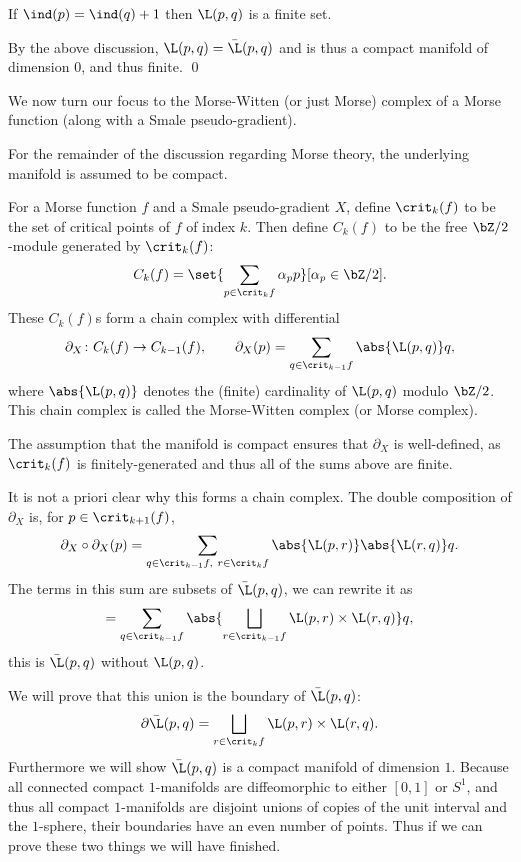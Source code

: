 \eproof

\bcoro

    If $\ind(p)=\ind(q)+1$ then $\L(p,q)$ is a finite set.

\ecoro

\bproof

    By the above discussion, $\L(p,q)=\bar\L(p,q)$ and is thus a compact manifold of dimension $0$, and thus finite.
    \qed

\eproof

We now turn our focus to the Morse-Witten (or just Morse) complex of a Morse function (along with a Smale pseudo-gradient).

\bimport

    For the remainder of the discussion regarding Morse theory, the underlying manifold is assumed to be
    compact.

\eimport

\bdefn

    For a Morse function $f$ and a Smale pseudo-gradient $X$, define $\crit_k(f)$ to be the set of
    critical points of $f$ of index $k$.
    Then define $C_k(f)$ to be the free $\bZ/2$-module generated by $\crit_k(f)$:
    $$ C_k(f) = \set{\sum_{p\in\crit_kf}\alpha_pp}[\alpha_p\in\bZ/2] . $$
    These $C_k(f)$s form a chain complex with differential
    $$ \partial_X\colon C_k(f) \to C_{k-1}(f),\qquad
    \partial_X(p) = \sum_{q\in\crit_{k-1}f}\abs{\L(p,q)}q , $$
    where $\abs{\L(p,q)}$ denotes the (finite) cardinality of $\L(p,q)$ modulo $\bZ/2$.
    This chain complex is called the {\emphcolor Morse-Witten complex} (or {\emphcolor Morse complex}).

\edefn

The assumption that the manifold is compact ensures that $\partial_X$ is well-defined, as $\crit_k(f)$ is
finitely-generated and thus all of the sums above are finite.

It is not a priori clear why this forms a chain complex.
The double composition of $\partial_X$ is, for $p\in\crit_{k+1}(f)$,
$$ \partial_X\circ\partial_X(p) = \sum_{q\in\crit_{k-1}f,\ r\in\crit_kf}\abs{\L(p,r)}\abs{\L(r,q)}q . $$
The terms in this sum are subsets of $\bar\L(p,q)$, we can rewrite it as
$$ = \sum_{q\in\crit_{k-1}f}\abs{\bigsqcup_{r\in\crit_{k-1}f}\L(p,r)\times\L(r,q)}q , $$
this is $\bar\L(p,q)$ without $\L(p,q)$.

We will prove that this union is the boundary of $\bar\L(p,q)$:
$$ \partial\bar\L(p,q) = \bigsqcup_{r\in\crit_kf}\L(p,r)\times\L(r,q) . $$
Furthermore we will show $\bar\L(p,q)$ is a compact manifold of dimension $1$.
Because all connected compact $1$-manifolds are diffeomorphic to either $[0,1]$ or $S^1$, and thus all
compact $1$-manifolds are disjoint unions of copies of the unit interval and the $1$-sphere, their
boundaries have an even number of points.
Thus if we can prove these two things we will have finished.

